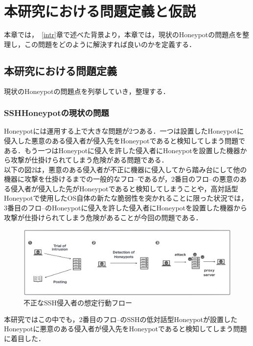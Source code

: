 \chapter{本研究における問題定義と仮説}
\label{appr}

本章では，~\ref{intr}章で述べた背景より，本章では，現状のHoneypotの問題点を整理し，この問題をどのように解決すれば良いのかを定義する．

\section{本研究における問題定義}
\label{appr:problem}
現状のHoneypotの問題点を列挙していき，整理する．

\subsection{SSH\，Honeypotの現状の問題}
\label{appr:problemofSshHoneypot}
Honeypotには運用する上で大きな問題が2つある．一つは設置したHoneypotに侵入した悪意のある侵入者が侵入先をHoneypotであると検知してしまう問題である．もう一つはHoneypotに侵入を許した侵入者にHoneypotを設置した機器から攻撃が仕掛けられてしまう危険がある問題である．\\
以下の図2は，悪意のある侵入者が不正に機器に侵入してから踏み台にして他の機器に攻撃を仕掛けるまでの一般的なフロ--であるが，2番目のフロ--の悪意のある侵入者が侵入した先がHoneypotであると検知してしまうことや，高対話型Honeypotで使用したOS自体の新たな脆弱性を突かれることに限った状況では，3番目のフロ--のHoneypotに侵入を許した侵入者にHoneypotを設置した機器から攻撃が仕掛けられてしまう危険があることが今回の問題である．

\vspace{10mm}
\begin{figure}[H]
    \centering
    \includegraphics[width=1.0\textwidth]{figures/nagare.png}
    \caption{不正なSSH侵入者の想定行動フロー}
    \label{fig:evo}
\end{figure}

本研究ではこの中でも，2番目のフロ--のSSHの低対話型Honeypotが設置したHoneypotに悪意のある侵入者が侵入先をHoneypotであると検知してしまう問題に着目した．

